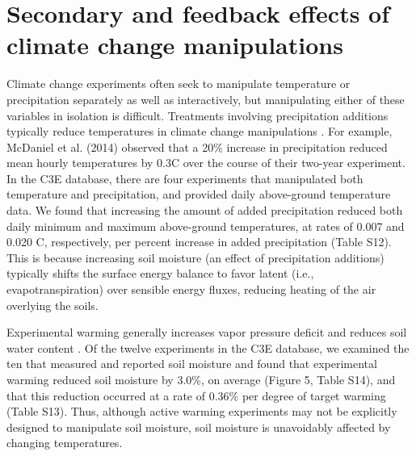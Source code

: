 \documentclass{article}
\begin{document}
\section* {Secondary and feedback effects of climate change manipulations} 
Climate change experiments often seek to manipulate temperature or precipitation separately as well as interactively, but manipulating either of these variables in isolation is difficult.  Treatments involving precipitation additions typically reduce temperatures in climate change manipulations \citep{sherry2007,rollinson2012,mcdaniel2014}. For example, McDaniel et al. (2014) observed that a 20\% increase in precipitation reduced mean hourly temperatures by 0.3\degree C over the course of their two-year experiment. In the C3E database, there are four experiments that manipulated both temperature and precipitation, and provided daily above-ground temperature data. We found that increasing the amount of added precipitation reduced both daily minimum and maximum above-ground temperatures, at rates of 0.007 and 0.020 \degree C, respectively, per percent increase in added precipitation (Table S12). This is because increasing soil moisture (an effect of precipitation additions) typically shifts the surface energy balance to favor latent (i.e., evapotranspiration) over sensible energy fluxes, reducing heating of the air overlying the soils. 
\par Experimental warming generally increases vapor pressure deficit and reduces soil water content \citep[e.g.,][]{sherry2007,morin2010,pelini2014,templer2016}. Of the twelve experiments in the C3E database, we examined the ten that measured and reported soil moisture and found that experimental warming reduced soil moisture by 3.0\%, on average (Figure 5, Table S14), and that this reduction occurred at a rate of 0.36\% per degree of target warming (Table S13). Thus, although active warming experiments may not be explicitly designed to manipulate soil moisture, soil moisture is unavoidably affected by changing temperatures. %
\end{document}
